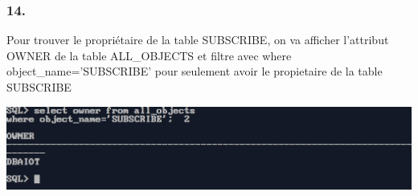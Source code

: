 \subsubsection*{14.}
Pour trouver le propriétaire de la table SUBSCRIBE, on va afficher
l'attribut OWNER de la table ALL\_OBJECTS et filtre avec where
object\_name='SUBSCRIBE' pour seulement avoir le propietaire de la table SUBSCRIBE



\begin{center}
    \includegraphics[width=\textwidth]{ScreenShot/Partie5/own.png}
\end{center}


